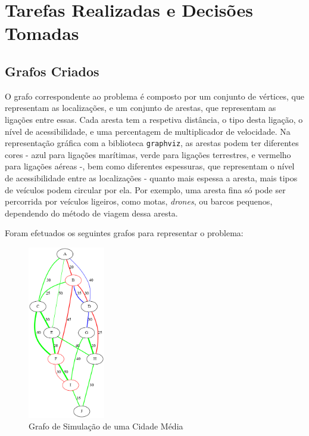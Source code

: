 \documentclass[a4paper,12pt]{scrreprt}
\begin{document}
\chapter{Tarefas Realizadas e Decisões Tomadas}

\section{Grafos Criados}

O grafo correspondente ao problema é composto por um conjunto de vértices, que representam as localizações, e um conjunto de arestas,
que representam as ligações entre essas. Cada aresta tem a respetiva distância, o tipo desta ligação, o nível de acessibilidade, 
e uma percentagem de multiplicador de velocidade.
Na representação gráfica com a biblioteca \texttt{graphviz}, as arestas podem ter diferentes cores - azul para ligações marítimas, 
verde para ligações terrestres, e vermelho para ligações aéreas -,
bem como diferentes espessuras, que representam o nível de acessibilidade entre as localizações - quanto mais espessa a aresta, mais
tipos de veículos podem circular por ela. Por exemplo, uma aresta fina só pode ser percorrida por veículos ligeiros, como motas,
\textit{drones}, ou barcos pequenos, dependendo do método de viagem dessa aresta.

Foram efetuados os seguintes grafos para representar o problema:

\begin{figure}[H]
    \centering
    \includegraphics[width=0.3\textwidth]{img/graph_medium_city.png}
    \caption{Grafo de Simulação de uma Cidade Média}
    \label{fig:graph_medium_city}
\end{figure}
\end{document}
